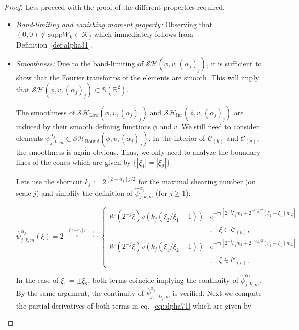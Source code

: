 \begin{proof}
Lets proceed with the proof of the different properties required.
\begin{itemize}
\item\textit{Band-limiting and vanishing moment property:} Observing that $(0,0)\notin \text{supp}W_k\subset \mathcal{K}_j$ which immediately follows from Definition~\ref{def:alpha31}.
\item\textit{Smoothness:} Due to the band-limiting of $\mathcal{SH}(\phi,v,(\alpha_j)_j)$, it is sufficient to show that the Fourier transforms of the elements are smooth. This will imply that $\mathcal{SH}(\phi,v,(\alpha_j)_j)\subset \mathbb{S}(\mathbb{R}^2)$. 

\bigskip

The smoothness of $\mathcal{SH}_{\text{Low}}(\phi,v,(\alpha_j)_j)$ and $\mathcal{SH}_{\text{Int}}(\phi,v,(\alpha_j)_j)$ are induced by their smooth defining functions $\phi$ and $v$. We still need to consider elements $\psi^{\alpha_j}_{j,k,m}\in\mathcal{SH}_{\text{Bound}}(\phi,v,(\alpha_j)_j)$. In the interior of $\mathcal{C}_{(h)}$ and $\mathcal{C}_{(v)}$, the smoothness is again obvious. Thus, we only need to analyze the boundary lines of the cones which are given by $\{|\xi_1|=|\xi_2|\}$.

\bigskip

Lets use the shortcut $k_j:=2^{(2-\alpha_j)j/2}$ for the maximal shearing number (on scale $j$) and simplify the definition of $\hat{\psi}_{j,k,m}^{\alpha_j}$ (for $j\geq 1$):

\begin{equation}
\label{eq:alpha71}
\hat{\psi}^{\alpha_j}_{j,k,m}(\xi)=2^{-\frac{(2+\alpha_j)j}{4}-\frac{1}{4}}\cdot
\begin{cases}
W(2^{-j}\xi)v(k_j(\xi_2/\xi_1-1))&e^{-\pi i[2^{-j}\xi_1 m_1+2^{-\alpha_j j/2}(\xi_2-\xi_1)m_2]}\\
& \textrm{,}\quad \xi\in\mathcal{C}_{(h)},\\
W(2^{-j}\xi)v(k_j(\xi_1/\xi_2-1))&e^{-\pi i[2^{-j}\xi_1 m_1+2^{-\alpha_j j/2}(\xi_2-\xi_1)m_2]}\\
&\textrm{,}\quad \xi\in\mathcal{C}_{(v)},
\end{cases}
\end{equation}

In the case of $\xi_1=\pm \xi_2$, both terms coincide implying the continuity of $\hat{\psi}_{j,k,m}^{\alpha_j}$. By the same argument, the continuity of $\hat{\psi}_{j,-k_j,m}^{\alpha_j}$ is verified. Next we compute the partial derivatives of both terms in eq.~\ref{eq:alpha71} which are given by


\end{itemize}
\end{proof}
